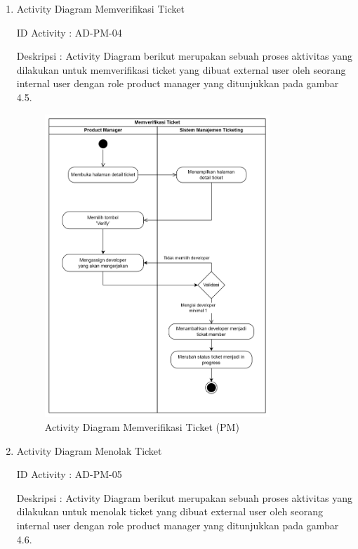 \documentclass[12pt]{article}
\begin{document}
\begin{enumerate}[label=\textbf{4.\arabic*.}]
\begin{enumerate}[label=\textbf{4.1.\arabic*.}, wide, labelwidth=!, labelindent=0pt]
\begin{enumerate}[label=\textbf{4.1.7.\arabic*.}, wide, labelwidth=!, labelindent=0pt]
\begin{enumerate}[label=\arabic*.]
                \item Activity Diagram Memverifikasi Ticket

                \noindent ID Activity	: AD-PM-04

                \noindent Deskripsi	: Activity Diagram berikut merupakan sebuah proses aktivitas yang dilakukan untuk memverifikasi ticket yang dibuat external user oleh seorang  internal user dengan role product manager yang ditunjukkan pada gambar 4.5.


                \begin{figure}[H]
                    \centering \includegraphics[width=0.8\textwidth]{images/activity/ipm/Memverifikasi Ticket.png}
                    \caption{Activity Diagram Memverifikasi Ticket (PM)}
                    \label{fig:AD-PM-04}
                \end{figure}


                \item Activity Diagram Menolak Ticket

                \noindent ID Activity	: AD-PM-05

                \noindent Deskripsi	: Activity Diagram berikut merupakan sebuah proses aktivitas yang dilakukan untuk menolak ticket yang dibuat external user oleh seorang  internal user dengan role product manager yang ditunjukkan pada gambar 4.6.



\end{enumerate}
\end{enumerate}
\end{enumerate}
\end{enumerate}
\end{document}

